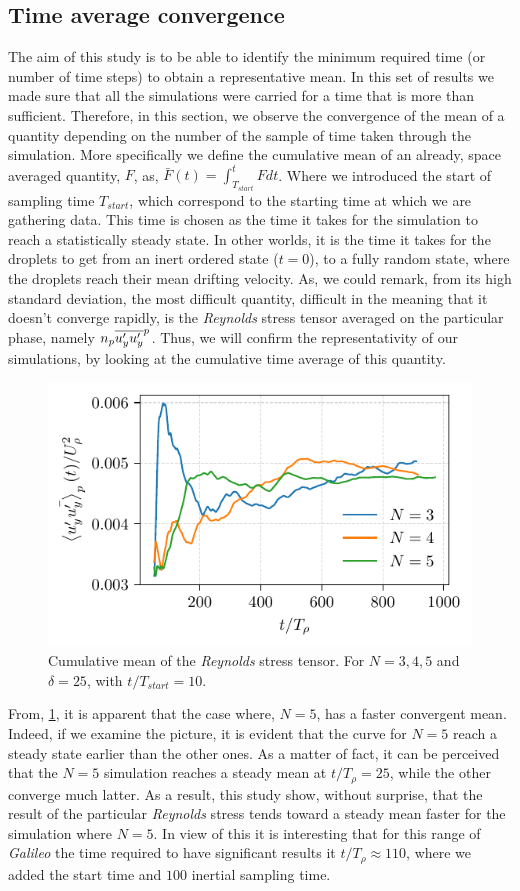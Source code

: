 \subsection{Time average convergence}

The aim of this study is to be able to identify the minimum required time (or number of time steps) to obtain a representative mean. 
In this set of results we made sure that all the simulations were carried for a time that is more than sufficient. 
Therefore, in this section, we observe the convergence of the mean of a quantity depending on the number of the sample of time taken through the simulation.
More specifically we define the cumulative mean of an already, space averaged quantity, $F$, as, 
$\bar{F}(t) = \int_{T_{start}}^{t} F dt$. 
Where we introduced the start of sampling time $T_{start}$, which correspond to the starting time at which we are gathering data. 
This time is chosen as the time it takes for the simulation to reach a statistically steady state.
In other worlds, it is the time it takes for the droplets to get from an inert ordered state ($t = 0$), to a fully random state, where the droplets reach their mean drifting velocity.
As, we could remark, from its high standard deviation, the most difficult quantity, difficult in the meaning that it doesn't converge rapidly, is the \textit{Reynolds} stress tensor averaged on the particular phase, namely $n_p\overline{u'_yu'_y}^{p}$.
Thus, we will confirm the representativity of our simulations, by looking at the cumulative time average of this quantity. 
\begin{figure}
    \centering
    \includegraphics[height = 0.3 \textwidth]{image/VALIDATION/time/UpUp.pdf}
    \caption{Cumulative mean of the \textit{Reynolds} stress tensor. For $N = 3,4,5$ and $\delta = 25$, with $t/T_{start} = 10$.}
    \label{fig:VALIDATION_cumul_mean}
\end{figure}
From, \ref{fig:VALIDATION_cumul_mean}, it is apparent that the case where, $N=5$, has a faster convergent mean. 
Indeed, if we examine the picture, it is evident that the curve for $N=5$ reach a steady state earlier than the other ones. 
As a matter of fact, it can be perceived that the $N=5$ simulation reaches a steady mean at $t/T_\rho = 25$, while the other converge much latter. 
As a result, this study show, without surprise, that the result of the particular \textit{Reynolds} stress tends toward a steady mean faster for the simulation where $N=5$. 
In view of this it is interesting that for this range of \textit{Galileo} the time required to have significant results it $t/T_{\rho} \approx 110$, where we added the start time and $100$ inertial sampling time. 


